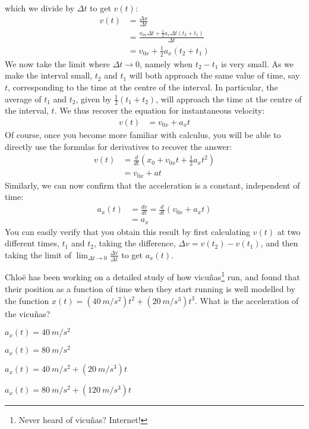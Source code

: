 which we divide by $\Delta t$ to get $v(t)$:
\begin{align*}
v(t) &= \frac{\Delta x}{\Delta t}\\
&=\frac{v_{0x}\Delta t+\frac{1}{2}a_x\Delta t (t_2+t_1)}{\Delta t}\\
&=v_{0x}+\frac{1}{2}a_x(t_2+t_1)
\end{align*}
We now take the limit where $\Delta t\to 0$, namely when $t_2-t_1$ is very small. As we make the interval small, $t_2$ and $t_1$ will both approach the same value of time, say $t$, corresponding to the time at the centre of the interval. In particular, the average of $t_1$ and $t_2$, given by $\frac{1}{2}(t_1+t_2)$, will approach the time at the centre of the interval, $t$. We thus recover the equation for instantaneous velocity:
\begin{align*}
v(t) &= v_{0x}+a_xt
\end{align*}
Of course, once you become more familiar with calculus, you will be able to directly use the formulas for derivatives to recover the answer:
\begin{align*}
v(t) &= \frac{d}{dt}\left( x_0+v_{0x}t+\frac{1}{2}a_xt^2 \right) \\
     &= v_{0x}+at 
\end{align*}
Similarly, we can now confirm that the acceleration is a constant, independent of time:
\begin{align*}
a_x(t) &= \frac{dv}{dt} = \frac{d}{dt}\left(v_{0x}+a_xt \right)\\
     &=a_x
\end{align*}
You can easily verify that you obtain this result by first calculating $v(t)$ at two different times, $t_1$ and $t_2$, taking the difference, $\Delta v = v(t_2)-v(t_1)$, and then taking the limit of $\lim_{\Delta t\to 0}\frac{\Delta v}{\Delta t}$ to get $a_x(t)$.

\begin{checkpointMC}{Chlo\"e has been working on a detailed study of how vicu\~nas\footnote{Never heard of vicu\~nas? Internet!} run, and found that their position as a function of time when they start running is well modelled by the function $x(t)=(\SI{40}{m/s^2})t^2+(\SI{20}{m/s^3})t^3$. What is the acceleration of the vicu\~nas?}
\item $a_x(t)=\SI{40}{m/s^2}$
\item $a_x(t)=\SI{80}{m/s^2}$
\item $a_x(t)=\SI{40}{m/s^2}+(\SI{20}{m/s^3})t$
\item $a_x(t)=\SI{80}{m/s^2}+(\SI{120}{m/s^3})t$ %
\end{checkpointMC}

